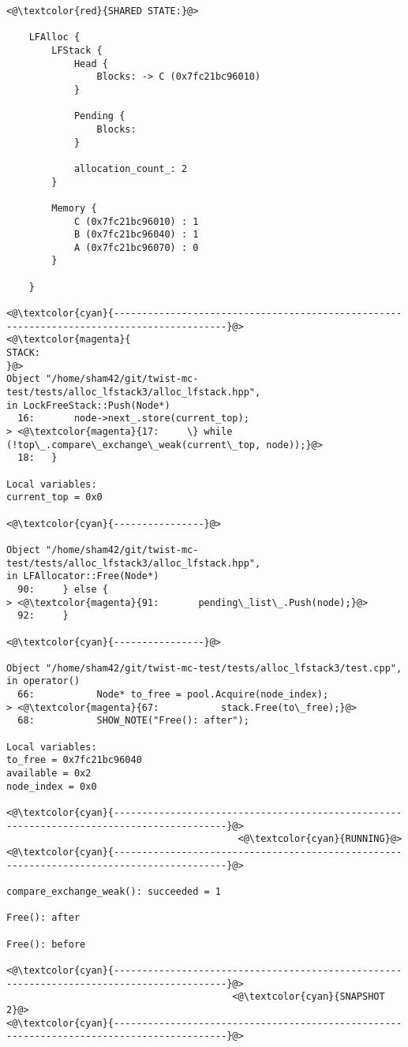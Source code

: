 \begin{adjustwidth}{-3.3cm}{-1cm}
\begin{allintypewriter}
\begin{multicols*}{2}
\begin{lstlisting}[numbers=none]
<@\textcolor{red}{SHARED STATE:}@>

    LFAlloc {
	    LFStack {
		    Head {
			    Blocks: -> C (0x7fc21bc96010) 
		    }

		    Pending {
			    Blocks: 
		    }

		    allocation_count_: 2
	    }

	    Memory {
		    C (0x7fc21bc96010) : 1
		    B (0x7fc21bc96040) : 1
		    A (0x7fc21bc96070) : 0
	    }

    }

<@\textcolor{cyan}{------------------------------------------------------------------------------------------}@>
<@\textcolor{magenta}{
STACK:
}@>
Object "/home/sham42/git/twist-mc-test/tests/alloc_lfstack3/alloc_lfstack.hpp",
in LockFreeStack::Push(Node*)
  16:       node->next_.store(current_top);
> <@\textcolor{magenta}{17:     \} while (!top\_.compare\_exchange\_weak(current\_top, node));}@>
  18:   }

Local variables: 
current_top = 0x0

<@\textcolor{cyan}{----------------}@>

Object "/home/sham42/git/twist-mc-test/tests/alloc_lfstack3/alloc_lfstack.hpp",
in LFAllocator::Free(Node*)
  90:     } else {
> <@\textcolor{magenta}{91:       pending\_list\_.Push(node);}@>
  92:     }

<@\textcolor{cyan}{----------------}@>

Object "/home/sham42/git/twist-mc-test/tests/alloc_lfstack3/test.cpp",
in operator()
  66:           Node* to_free = pool.Acquire(node_index);
> <@\textcolor{magenta}{67:           stack.Free(to\_free);}@>
  68:           SHOW_NOTE("Free(): after");

Local variables: 
to_free = 0x7fc21bc96040
available = 0x2
node_index = 0x0

<@\textcolor{cyan}{------------------------------------------------------------------------------------------}@>
                                         <@\textcolor{cyan}{RUNNING}@>
<@\textcolor{cyan}{------------------------------------------------------------------------------------------}@>

compare_exchange_weak(): succeeded = 1

Free(): after

Free(): before

<@\textcolor{cyan}{------------------------------------------------------------------------------------------}@>
                                        <@\textcolor{cyan}{SNAPSHOT 2}@>
<@\textcolor{cyan}{------------------------------------------------------------------------------------------}@>


\end{lstlisting}
\end{multicols*}
\end{allintypewriter}
\end{adjustwidth}
